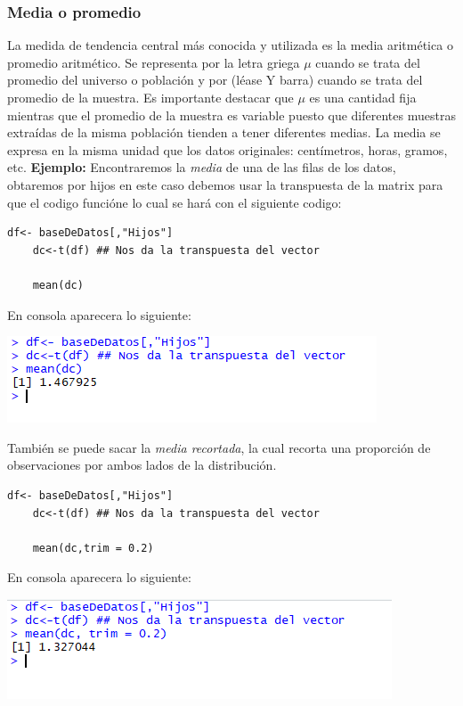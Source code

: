\documentclass[12pt,hidelinks]{article}
\begin{document}
	\subsubsection{Media o promedio}
	\vspace{2mm}
	La medida de tendencia central más conocida y utilizada es la media aritmética o promedio aritmético. Se representa por la letra griega $\mu$ cuando se trata del promedio del universo o población y por (léase Y barra) cuando se trata del promedio de la muestra. Es importante destacar que $\mu$ es una cantidad fija mientras que el promedio de la muestra es variable puesto que diferentes muestras extraídas de la misma población tienden a tener diferentes medias. La media se expresa en la misma unidad que los datos originales: centímetros, horas, gramos, etc.
	\vspace{2mm}
	\textbf{Ejemplo:}
	\vspace{1mm}
	Encontraremos la \textit{media} de una de las filas de los datos, obtaremos por hijos  en este caso debemos usar la transpuesta de la matrix para que el codigo funcióne lo cual se hará con el siguiente codigo:
	\begin{lstlisting}[frame=single]
	df<- baseDeDatos[,"Hijos"]
	dc<-t(df) ## Nos da la transpuesta del vector
	
	mean(dc)
	\end{lstlisting}
	En consola aparecera lo siguiente:
	
	\begin{center}
		\includegraphics[]{media.PNG}
	\end{center}
	También se puede sacar la \textit{media recortada}, la cual recorta una proporción de observaciones por ambos lados de la distribución.
	\begin{lstlisting}[frame=single]
	df<- baseDeDatos[,"Hijos"]
	dc<-t(df) ## Nos da la transpuesta del vector
	
	mean(dc,trim = 0.2)
	\end{lstlisting}
	En consola aparecera lo siguiente:
	\begin{center}
		\includegraphics[]{mediaR.PNG}
	\end{center}
\end{document}
